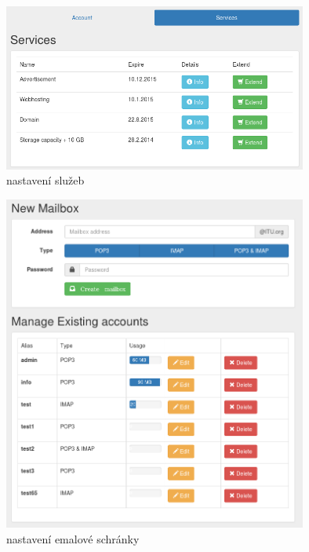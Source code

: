 \documentclass[11pt,a4paper]{article}
\begin{document}
      \begin{figure}[ht]
        \begin{center}
          \includegraphics[width=10cm]{srvc}
          \caption{nastavení služeb}
        \end{center}
      \end{figure}

      \begin{figure}[ht]
        \begin{center}
          \includegraphics[width=10cm]{email}
          \caption{nastavení emalové schránky}
        \end{center}
      \end{figure}
\end{document}
